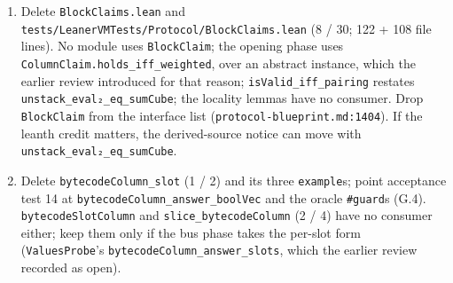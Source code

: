 \begin{enumerate}
\item Delete \texttt{BlockClaims.\allowbreak{}lean} and \texttt{t\allowbreak{}e\allowbreak{}s\allowbreak{}t\allowbreak{}s\allowbreak{}/\allowbreak{}L\allowbreak{}e\allowbreak{}a\allowbreak{}n\allowbreak{}e\allowbreak{}r\allowbreak{}V\allowbreak{}M\allowbreak{}T\allowbreak{}e\allowbreak{}s\allowbreak{}t\allowbreak{}s\allowbreak{}/\allowbreak{}P\allowbreak{}r\allowbreak{}o\allowbreak{}t\allowbreak{}o\allowbreak{}c\allowbreak{}o\allowbreak{}l\allowbreak{}/\allowbreak{}B\allowbreak{}l\allowbreak{}o\allowbreak{}c\allowbreak{}k\allowbreak{}C\allowbreak{}l\allowbreak{}a\allowbreak{}i\allowbreak{}m\allowbreak{}s\allowbreak{}.\allowbreak{}l\allowbreak{}e\allowbreak{}a\allowbreak{}n} (8 / 30; 122 + 108 file lines). No module uses \texttt{BlockClaim}; the opening phase uses \texttt{C\allowbreak{}o\allowbreak{}l\allowbreak{}u\allowbreak{}m\allowbreak{}n\allowbreak{}C\allowbreak{}l\allowbreak{}a\allowbreak{}i\allowbreak{}m\allowbreak{}.\allowbreak{}h\allowbreak{}o\allowbreak{}l\allowbreak{}d\allowbreak{}s\allowbreak{}\_\allowbreak{}i\allowbreak{}f\allowbreak{}f\allowbreak{}\_\allowbreak{}w\allowbreak{}e\allowbreak{}i\allowbreak{}g\allowbreak{}h\allowbreak{}t\allowbreak{}e\allowbreak{}d}, over an abstract instance, which the earlier review introduced for that reason; \texttt{isValid\_\allowbreak{}iff\_\allowbreak{}pairing} restates \texttt{unstack\_\allowbreak{}eval₂\_\allowbreak{}eq\_\allowbreak{}sumCube}; the locality lemmas have no consumer. Drop \texttt{BlockClaim} from the interface list (\texttt{protocol-{}blueprint.\allowbreak{}md:1404}). If the leanth credit matters, the derived-source notice can move with \texttt{unstack\_\allowbreak{}eval₂\_\allowbreak{}eq\_\allowbreak{}sumCube}.
\item Delete \texttt{bytecodeColumn\_\allowbreak{}slot} (1 / 2) and its three \texttt{example}s; point acceptance test 14 at \texttt{b\allowbreak{}y\allowbreak{}t\allowbreak{}e\allowbreak{}c\allowbreak{}o\allowbreak{}d\allowbreak{}e\allowbreak{}C\allowbreak{}o\allowbreak{}l\allowbreak{}u\allowbreak{}m\allowbreak{}n\allowbreak{}\_\allowbreak{}a\allowbreak{}n\allowbreak{}s\allowbreak{}w\allowbreak{}e\allowbreak{}r\allowbreak{}\_\allowbreak{}b\allowbreak{}o\allowbreak{}o\allowbreak{}l\allowbreak{}V\allowbreak{}e\allowbreak{}c} and the oracle \texttt{\#guard}s (G.4). \texttt{bytecodeSlotColumn} and \texttt{slice\_\allowbreak{}bytecodeColumn} (2 / 4) have no consumer either; keep them only if the bus phase takes the per-slot form (\texttt{ValuesProbe}'s \texttt{bytecodeColumn\_\allowbreak{}answer\_\allowbreak{}slots}, which the earlier review recorded as open).

\end{enumerate}
